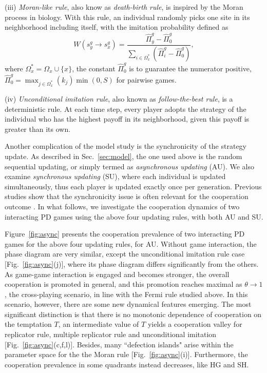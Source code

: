 \documentclass[showpacs,superscriptaddress,reprint,nofootinbib,amsmath,amssymb,aps,pre]{revtex4-1}
\begin{document}
(iii) \emph{Moran-like rule}, also know as \emph{death-birth rule}, is inspired by the Moran process in biology. With this rule, an individual randomly picks one site in its neighborhood including itself, with the imitation probability defined as
 \begin{equation}
W(s^g_y \rightarrow s^g_x)=\frac{\widehat{\Pi}_y^g-\widehat{\Pi}_0^g}{\sum_{i\in \Omega^*_x} (\widehat{\Pi}_i^g-\widehat{\Pi}_0^g)},\label{eq:MLR}
\end{equation}
where $\Omega^*_x=\Omega_x \cup \{x\}$, the constant $\widehat{\Pi}_0^g$ is to guarantee the numerator positive, $\widehat{\Pi}_0^g=\max_{j\in\Omega^*_x} (k_j)\min(0,S)$ for pairwise games.

(iv) \emph{Unconditional imitation rule}, also known as \emph{follow-the-best rule}, is a deterministic rule. At each time step, every player adopts the strategy of the individual who has the highest payoff in its neighborhood, given this payoff is greater than its own.
 
Another complication of the model study is the synchronicity of the strategy update. As described in Sec.~\ref{sec:model}, the one used above is the random sequential updating, or simply termed as \emph{asynchronous updating} (AU). We also examine \emph{synchronous updating} (SU), where each individual is updated simultaneously, thus each player is updated exactly once per generation. Previous studies show that the synchronicity issue is often relevant for the cooperation outcome \cite{roca2009evolutionary}. In what follows, we investigate the cooperation dynamics of two interacting PD games using the above four updating rules, with both AU and SU. 

Figure~\ref{fig:async} presents the cooperation prevalence of two interacting PD games for the above four updating rules, for AU.  Without game interaction, the phase diagram are very similar, except the unconditional imitation rule case [Fig.~\ref{fig:async}(j)], where its phase diagram differs significantly from the others. As game-game interaction is engaged and becomes stronger, the overall cooperation is promoted in general, and this promotion reaches maximal as $\theta \rightarrow1$, the cross-playing scenario, in line with the Fermi rule studied above. In this scenario, however, there are some new dynamical features emerging. The most significant distinction is that  there is no monotonic dependence of cooperation on the temptation $T$, an intermediate value of $T$ yields a cooperation valley for replicator rule, multiple replicator rule and unconditional imitation [Fig.~\ref{fig:async}(c,f,l)]. Besides, many ``defection islands" arise within the parameter space for the the Moran rule [Fig.~\ref{fig:async}(i)]. Furthermore, the cooperation prevalence in some quadrants instead decreases, like HG and SH.
\end{document}
